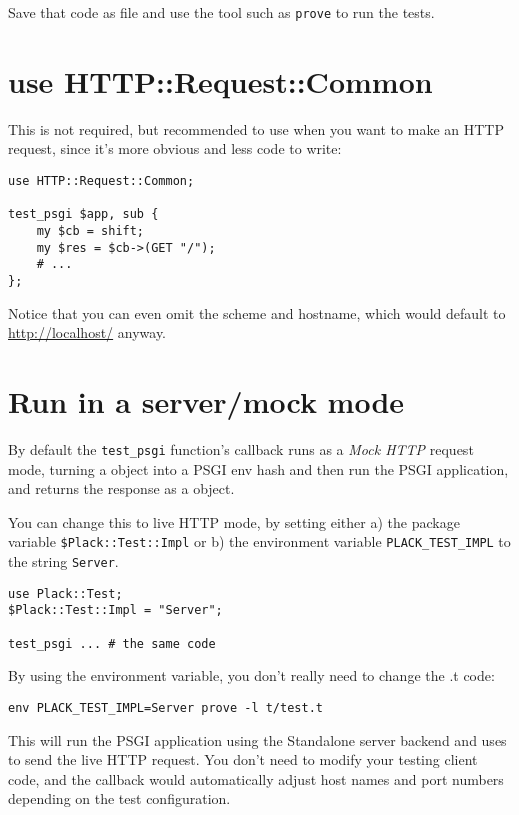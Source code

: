 Save that code as  file and use the tool such as
\lstinline!prove! to run the tests.

\section{use HTTP::Request::Common}\label{use-httprequestcommon}

This is not required, but recommended to use
\href{http://search.cpan.org/perldoc?HTTP::Request::Common}{}
when you want to make an HTTP request, since it's more obvious and less
code to write:

\begin{lstlisting}
use HTTP::Request::Common;

test_psgi $app, sub {
    my $cb = shift;
    my $res = $cb->(GET "/");
    # ...
};
\end{lstlisting}

Notice that you can even omit the scheme and hostname, which would
default to \url{http://localhost/} anyway.

\section{Run in a server/mock mode}\label{run-in-a-servermock-mode}

By default the \lstinline!test_psgi! function's callback runs as a
\emph{Mock HTTP} request mode, turning a  object into a
PSGI env hash and then run the PSGI application, and returns the
response as a  object.

You can change this to live HTTP mode, by setting either a) the package
variable \lstinline!$Plack::Test::Impl! or b) the environment variable
\lstinline!PLACK_TEST_IMPL! to the string \lstinline!Server!.

\begin{lstlisting}
use Plack::Test;
$Plack::Test::Impl = "Server";

test_psgi ... # the same code
\end{lstlisting}

By using the environment variable, you don't really need to change the
.t code:

\begin{lstlisting}
env PLACK_TEST_IMPL=Server prove -l t/test.t
\end{lstlisting}

This will run the PSGI application using the Standalone server backend
and uses  to send the live HTTP request. You don't need to
modify your testing client code, and the callback would automatically
adjust host names and port numbers depending on the test configuration.

